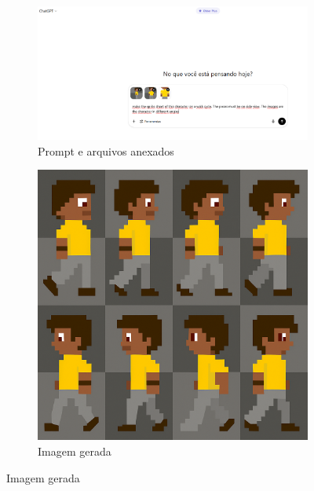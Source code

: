 \begin{figure}[htbp]
    \centering
    \caption{\small Processo da utilização 4 do ChatGPTem julho/2025}
    \label{fig:chatGPT5}

    \begin{subfigure}{1\linewidth}
        \includegraphics[width=1\linewidth]{figs/chatGPT/walking_cycle/side_view/tela1.PNG}
        \caption{\small Prompt e arquivos anexados}
        \label{fig:chatGPT5a}
    \end{subfigure}

    \begin{subfigure}{0.5\linewidth}
        \includegraphics[width=1\linewidth]{figs/chatGPT/walking_cycle/side_view/walking cycle 1.png}
        \caption{\small Imagem gerada}
        \label{fig:chatGPT5b}
    \end{subfigure}
\end{figure}

